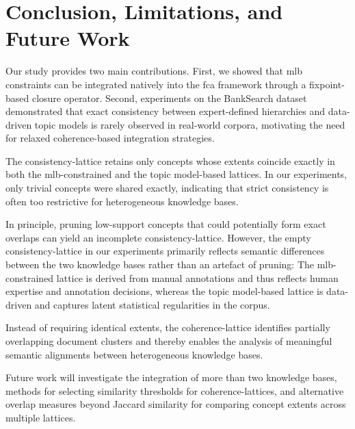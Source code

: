 \section{Conclusion, Limitations, and Future Work}
\label{sec:future_work}

Our study provides two main contributions. 
First, we showed that \ac{mlb} constraints can be integrated natively into the \ac{fca} framework through a fixpoint-based closure operator. 
Second, experiments on the BankSearch dataset demonstrated that exact consistency between expert-defined hierarchies and data-driven topic models is rarely observed in real-world corpora, motivating the need for relaxed coherence-based integration strategies.

The consistency-lattice retains only concepts whose extents coincide exactly in both the \ac{mlb}-constrained and the topic model-based lattices. 
In our experiments, only trivial concepts were shared exactly, indicating that strict consistency is often too restrictive for heterogeneous knowledge bases.

In principle, pruning low-support concepts that could potentially form exact overlaps can yield an incomplete consistency-lattice. 
However, the empty consistency-lattice in our experiments primarily reflects semantic differences between the two knowledge bases rather than an artefact of pruning: 
The \ac{mlb}-constrained lattice is derived from manual annotations and thus reflects human expertise and annotation decisions, whereas the topic model-based lattice is data-driven and captures latent statistical regularities in the corpus. 

Instead of requiring identical extents, the coherence-lattice identifies partially overlapping document clusters and thereby enables the analysis of meaningful semantic alignments between heterogeneous knowledge bases. 

Future work will investigate the integration of more than two knowledge bases, methods for selecting similarity thresholds for coherence-lattices, and alternative overlap measures beyond Jaccard similarity for comparing concept extents across multiple lattices.
